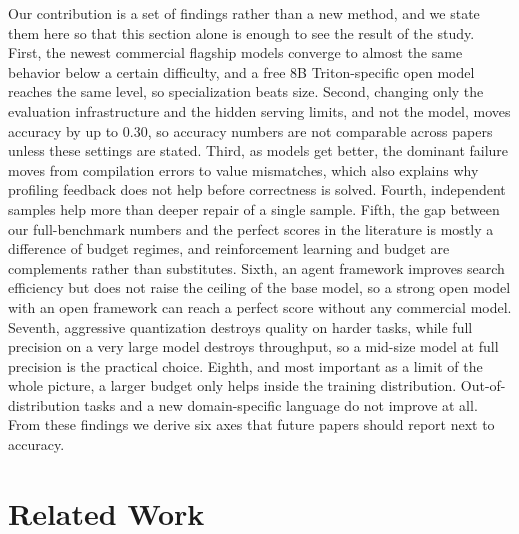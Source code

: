 \documentclass[11pt]{article}
\begin{document}
Our contribution is a set of findings rather than a new method, and we state them here so that
this section alone is enough to see the result of the study. First, the newest commercial
flagship models converge to almost the same behavior below a certain difficulty, and a free 8B
Triton-specific open model reaches the same level, so specialization beats size. Second,
changing only the evaluation infrastructure and the hidden serving limits, and not the model,
moves accuracy by up to 0.30, so accuracy numbers are not comparable across papers unless
these settings are stated. Third, as models get better, the dominant failure moves from
compilation errors to value mismatches, which also explains why profiling feedback does not
help before correctness is solved. Fourth, independent samples help more than deeper repair of
a single sample. Fifth, the gap between our full-benchmark numbers and the perfect scores in
the literature is mostly a difference of budget regimes, and reinforcement learning and budget
are complements rather than substitutes. Sixth, an agent framework improves search efficiency
but does not raise the ceiling of the base model, so a strong open model with an open framework
can reach a perfect score without any commercial model. Seventh, aggressive quantization
destroys quality on harder tasks, while full precision on a very large model destroys
throughput, so a mid-size model at full precision is the practical choice. Eighth, and most
important as a limit of the whole picture, a larger budget only helps inside the training
distribution. Out-of-distribution tasks and a new domain-specific language do not improve at
all. From these findings we derive six axes that future papers should report next to accuracy.

\section{Related Work}\label{sec:related}
\end{document}
